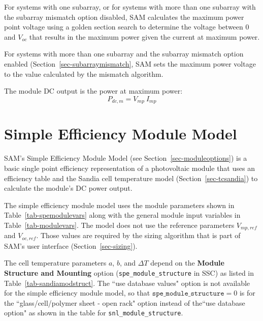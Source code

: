 \documentclass[12pt,letterpaper]{article}
\begin{document}
For systems with one subarray, or for systems with more than one subarray with the subarray mismatch option disabled, SAM calculates the maximum power point voltage using a golden section search to determine the voltage between 0 and $V_{oc}$ that results in the maximum power given the current at maximum power.

For systems with more than one subarray and the subarray mismatch option enabled (Section~\ref{sec-subarraymismatch}, SAM sets the maximum power voltage to the value calculated by the mismatch algorithm.

The module DC output is the power at maximum power:
\begin{equation}
P_{dc,m} = V_{mp}~I_{mp}
\end{equation}

\section{Simple Efficiency Module Model}\label{sec-simplemodule}

SAM's Simple Efficiency Module Model  (see Section~\ref{sec-moduleoptions}) is a basic single point efficiency representation of a photovoltaic module that uses an efficiency table and the Sandia cell temperature model (Section~\ref{sec-tcsandia}) to calculate the module's DC power output.

The simple efficiency module model uses the module parameters shown in Table~\ref{tab-spemodulevars} along with the general module input variables in Table~\ref{tab-modulevars}. The model does not use the reference parameters $V_{mp,ref}$ and $V_{oc,ref}$. Those values are required by the sizing algorithm that is part of SAM's user interface (Section~\ref{sec-sizing}).

The cell temperature parameters $a$, $b$, and $\Delta T$ depend on the \textbf{Module Structure and Mounting} option (\texttt{spe\_module\_structure} in SSC) as listed in Table~\ref{tab-sandiamodstruct}. The ``use database values" option is not available for the simple efficiency module model, so that  $\mathtt{spe\_module\_structure}=0$ is for the ``glass/cell/polymer sheet - open rack" option instead of the``use database option" as shown in the table for \texttt{snl\_module\_structure}.
\end{document}
